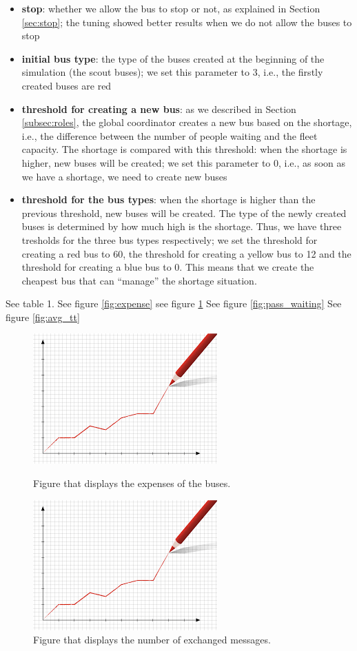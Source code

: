 \documentclass{article}
\begin{document}
\begin{itemize}
\item \textbf{stop}: whether we allow the bus to stop or not, as explained in Section \ref{sec:stop}; the tuning showed better results when we do not allow the buses to stop
\item \textbf{initial bus type}: the type of the buses created at the beginning of the simulation (the scout buses); we set this parameter to 3, i.e., the firstly created buses are red
\item \textbf{threshold for creating a new bus}: as we described in Section \ref{subsec:roles}, the global coordinator creates a new bus based on the shortage, i.e., the difference between the number of people waiting and the fleet capacity. The shortage is compared with this threshold: when the shortage is higher, new buses will be created; we set this parameter to 0, i.e., as soon as we have a shortage, we need to create new buses
\item \textbf{threshold for the bus types}: when the shortage is higher than the previous threshold, new buses will be created. The type of the newly created buses is determined by how much high is the shortage. Thus, we have three tresholds for the three bus types respectively; we set the threshold for creating a red bus to 60, the threshold for creating a yellow bus to 12 and the threshold for creating a blue bus to 0. This means that we create the cheapest bus that can ``manage'' the shortage situation. 
\end{itemize}

See table 1.
See figure \ref{fig:expense}
see figure \ref{fig:messages}
See figure \ref{fig:pass_waiting}
See figure \ref{fig:avg_tt}

\begin{figure}
\centering
\begin{minipage}{.5\textwidth}
  \includegraphics[width=.4\textwidth]{expenses.jpg}
  \caption{\label{fig:expense}Figure that displays the expenses of the buses.}
\end{minipage}%
\begin{minipage}{.5\textwidth}
  \includegraphics[width=.4\textwidth]{nr_messages.jpg}
  \caption{\label{fig:messages}Figure that displays the number of exchanged messages.}
\end{minipage}
\end{figure}
\end{document}

